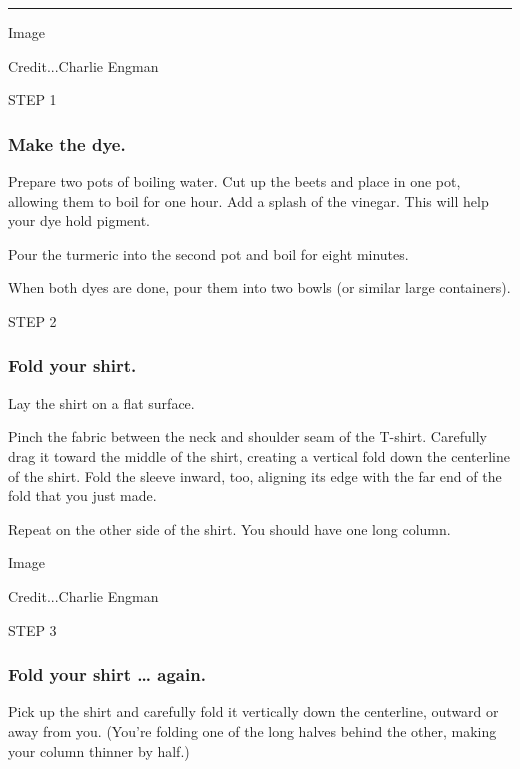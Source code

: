 \begin{center}\rule{0.5\linewidth}{\linethickness}\end{center}

Image

Credit...Charlie Engman

STEP 1

\hypertarget{make-the-dye}{%
\subsubsection{\texorpdfstring{\textbf{Make the
dye.}}{Make the dye.}}\label{make-the-dye}}

Prepare two pots of boiling water. Cut up the beets and place in one
pot, allowing them to boil for one hour. Add a splash of the vinegar.
This will help your dye hold pigment.

Pour the turmeric into the second pot and boil for eight minutes.

When both dyes are done, pour them into two bowls (or similar large
containers).

STEP 2

\hypertarget{fold-your-shirt}{%
\subsubsection{\texorpdfstring{\textbf{Fold your
shirt.}}{Fold your shirt.}}\label{fold-your-shirt}}

Lay the shirt on a flat surface.

Pinch the fabric between the neck and shoulder seam of the T-shirt.
Carefully drag it toward the middle of the shirt, creating a vertical
fold down the centerline of the shirt. Fold the sleeve inward, too,
aligning its edge with the far end of the fold that you just made.

Repeat on the other side of the shirt. You should have one long column.

Image

Credit...Charlie Engman

STEP 3

\hypertarget{fold-your-shirt--again}{%
\subsubsection{\texorpdfstring{\textbf{Fold your shirt \ldots{}
again.}}{Fold your shirt \ldots{} again.}}\label{fold-your-shirt--again}}

Pick up the shirt and carefully fold it vertically down the centerline,
outward or away from you. (You're folding one of the long halves behind
the other, making your column thinner by half.)

